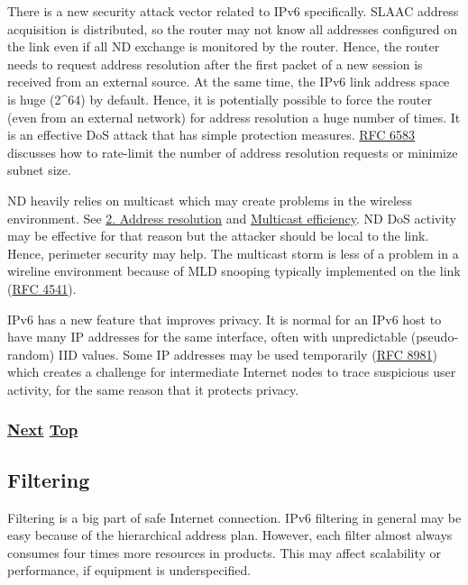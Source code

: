 \documentclass[
]{article}
\begin{document}
There is a new security attack vector related to IPv6 specifically.
SLAAC address acquisition is distributed, so the router may not know all
addresses configured on the link even if all ND exchange is monitored by
the router. Hence, the router needs to request address resolution after
the first packet of a new session is received from an external source.
At the same time, the IPv6 link address space is huge (2\^{}64) by
default. Hence, it is potentially possible to force the router (even
from an external network) for address resolution a huge number of times.
It is an effective DoS attack that has simple protection measures.
\href{https://www.rfc-editor.org/info/rfc6583}{RFC 6583} discusses how
to rate-limit the number of address resolution requests or minimize
subnet size.

ND heavily relies on multicast which may create problems in the wireless
environment. See \hyperref[address-resolution]{2. Address resolution}
and
\href{https://datatracker.ietf.org/doc/draft-vyncke-6man-mcast-not-efficient}{Multicast
efficiency}. ND DoS activity may be effective for that reason but the
attacker should be local to the link. Hence, perimeter security may
help. The multicast storm is less of a problem in a wireline environment
because of MLD snooping typically implemented on the link
(\href{https://www.rfc-editor.org/info/rfc4541}{RFC 4541}).

IPv6 has a new feature that improves privacy. It is normal for an IPv6
host to have many IP addresses for the same interface, often with
unpredictable (pseudo-random) IID values. Some IP addresses may be used
temporarily (\href{https://www.rfc-editor.org/info/rfc8981}{RFC 8981})
which creates a challenge for intermediate Internet nodes to trace
suspicious user activity, for the same reason that it protects privacy.

\subsubsection{\texorpdfstring{\hyperref[filtering]{Next}
\hyperref[security]{Top}}{Next Top}}\label{next-top-3}

\pagebreak

\subsection{Filtering}\label{filtering}

Filtering is a big part of safe Internet connection. IPv6 filtering in
general may be easy because of the hierarchical address plan. However,
each filter almost always consumes four times more resources in
products. This may affect scalability or performance, if equipment is
underspecified.
\end{document}
